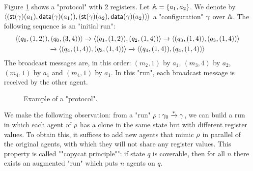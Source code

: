 \begin{example}\label{ex:example-1}


	Figure \ref{fig:ex1} shows a "protocol" with 2 registers. 
	Let $\mathbb{A} = \{a_1, a_2\}$. We denote by $\langle (\mathsf{st}(\gamma)(a_1), \mathsf{data}(\gamma)(a_1)), (\mathsf{st}(\gamma)(a_2),\mathsf{data}(\gamma)(a_2)) \rangle$ a "configuration" $\gamma$ over $\mathbb{A}$. The following sequence is an "initial run":\vspace{-0.2cm}
	\begin{multline*}
		\langle (q_0, (1,2)), (q_0,(3,4)) \rangle \xrightarrow{} \langle (q_1, (1,2)), (q_2,(1,4)) \rangle \xrightarrow{} 
		\langle (q_3, (1,4)), (q_3,(1,4)) \rangle \\ \xrightarrow{} \langle (q_4, (1,4)), (q_3,(1,4)) \rangle \xrightarrow{} \langle (q_4, (1,4)), (q_4,(1,4)) \rangle
	\end{multline*}
	The broadcast messages are, in this order: $(m_2,1)$ by $a_1$, $(m_3,4)$ by $a_2$, $(m_4,1)$ by $a_1$ and $(m_4,1)$ by $a_1$. In this "run", each broadcast message is received by the other agent. 
\end{example}

\begin{figure}[t]
	\centering
	\resizebox*{!}{3.2cm}{
		
	}
	\caption{Example of a "protocol".}\label{fig:ex1}
\end{figure}
	
	


\begin{remark}
	\label{rem:copycat-principle}
	We make the following observation: from a "run" $\rho : \gamma_0 \xrightarrow{\ast} \gamma$, we can build a run in which each agent of $\rho$ has  a clone in the same state but with different register values. To obtain this, it suffices to add new agents that mimic $\rho$ in parallel of the original agents, with which they will not share any register values.  This property is called ""copycat principle"": if state $q$ is coverable, then for all $n$ there exists an augmented "run" which puts $n$ agents on $q$.
\end{remark}

